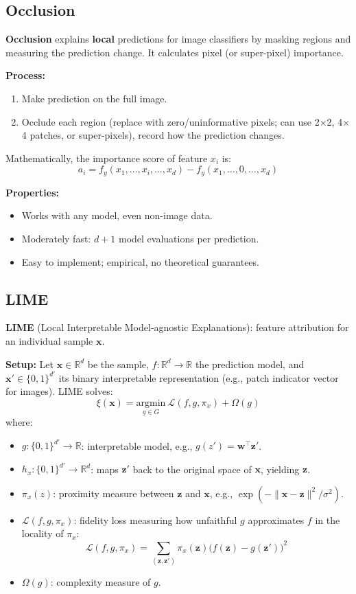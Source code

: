 \documentclass[UTF8]{ctexart}
\begin{document}
\subsection{Occlusion}

\textbf{Occlusion} explains \textbf{local} predictions for image classifiers by masking regions and measuring the prediction change. It calculates pixel (or super-pixel) importance.

\textbf{Process:}
\begin{enumerate}
    \item Make prediction on the full image.
    \item Occlude each region (replace with zero/uninformative pixels; can use 2$\times$2, 4$\times$4 patches, or super-pixels), record how the prediction changes.
\end{enumerate}

Mathematically, the importance score of feature $x_i$ is:
\[
    a_i = f_y(x_1, \ldots, x_i, \ldots, x_d) - f_y(x_1, \ldots, 0, \ldots, x_d)
\]

\textbf{Properties:}
\begin{itemize}
    \item Works with any model, even non-image data.
    \item Moderately fast: $d+1$ model evaluations per prediction.
    \item Easy to implement; empirical, no theoretical guarantees.
\end{itemize}

\subsection{LIME}

\textbf{LIME} (Local Interpretable Model-agnostic Explanations): feature attribution for an individual sample $\mathbf{x}$.

\textbf{Setup:} Let $\mathbf{x} \in \mathbb{R}^d$ be the sample, $f: \mathbb{R}^d \to \mathbb{R}$ the prediction model, and $\mathbf{x}' \in \{0,1\}^{d'}$ its binary interpretable representation (e.g., patch indicator vector for images). LIME solves:
\[
    \xi(\mathbf{x}) = \underset{g \in G}{\mathrm{argmin}}\ \mathcal{L}(f, g, \pi_x) + \Omega(g)
\]
where:
\begin{itemize}
    \item $g: \{0,1\}^{d'} \to \mathbb{R}$: interpretable model, e.g., $g(z') = \mathbf{w}^\top \mathbf{z}'$.
    \item $h_x: \{0,1\}^{d'} \to \mathbb{R}^d$: maps $\mathbf{z}'$ back to the original space of $\mathbf{x}$, yielding $\mathbf{z}$.
    \item $\pi_x(z)$: proximity measure between $\mathbf{z}$ and $\mathbf{x}$, e.g., $\exp(-\|\mathbf{x} - \mathbf{z}\|^2/\sigma^2)$.
    \item $\mathcal{L}(f, g, \pi_x)$: fidelity loss measuring how unfaithful $g$ approximates $f$ in the locality of $\pi_x$:
    \[
        \mathcal{L}(f, g, \pi_x) = \sum_{(\mathbf{z}, \mathbf{z}')} \pi_x(\mathbf{z})\bigl(f(\mathbf{z}) - g(\mathbf{z}')\bigr)^2
    \]
    \item $\Omega(g)$: complexity measure of $g$.
\end{itemize}
\end{document}
